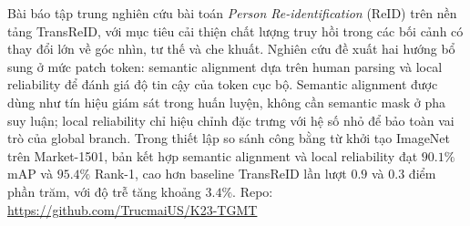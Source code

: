 Bài báo tập trung nghiên cứu bài toán \textit{Person Re-identification} (ReID)
trên nền tảng TransReID, với mục tiêu cải thiện chất lượng truy hồi trong các
bối cảnh có thay đổi lớn về góc nhìn, tư thế và che khuất. Nghiên cứu đề xuất
hai hướng bổ sung ở mức patch token: semantic alignment dựa trên human parsing
và local reliability để đánh giá độ tin cậy của token cục bộ. Semantic
alignment được dùng như tín hiệu giám sát trong huấn luyện, không cần semantic
mask ở pha suy luận; local reliability chỉ hiệu chỉnh đặc trưng với hệ số nhỏ
để bảo toàn vai trò của global branch. Trong thiết lập so sánh công bằng từ
khởi tạo ImageNet trên Market-1501, bản kết hợp semantic alignment và local
reliability đạt $90.1\%$ mAP và $95.4\%$ Rank-1, cao hơn baseline TransReID lần
lượt $0.9$ và $0.3$ điểm phần trăm, với độ trễ tăng khoảng $3.4\%$. Repo:
\url{https://github.com/TrucmaiUS/K23-TGMT}

